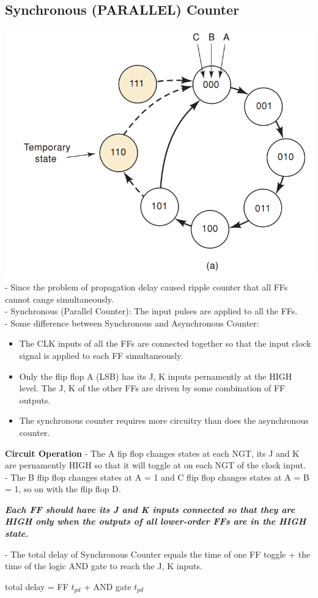 \documentclass[12pt]{article}
\begin{document}
\subsection{Synchronous (PARALLEL) Counter}
\includegraphics[scale = 0.6]{hinh41}
\bigbreak
- Since the problem of propagation delay caused ripple counter that all FFs cannot cange simultaneously. \\
- Synchronous (Parallel Counter): The input pulses are applied to all the FFs. \\
- Some difference between Synchronous and Asynchronous Counter: \\
\begin{itemize}
	\item The CLK inputs of all the FFs are connected together so that the input clock signal is applied to each FF simultaneously.
	\item Only the flip flop A (LSB) has its J, K inputs pernamently at the HIGH level.
	The J, K of the other FFs are driven by some combination of FF outputs.
	\item The synchronous counter requires more circuitry than does the asynchronous counter.
\end{itemize}
\textbf{Circuit Operation}
- The A fip flop changes states at each NGT, its J and K are pernamently HIGH so that it will toggle at on each NGT of the clock input. \\
- The B flip flop changes states at A = 1 and C flip flop changes states at A = B = 1, so on with the flip flop D. \\
\begin{center}
\textit{\textbf{Each FF should have its J and K inputs connected so that they are HIGH only when the outputs of all lower-order FFs are in the HIGH state.}}
\end{center}
- The total delay of Synchronous Counter equals the time of one FF toggle + the time of the logic AND gate to reach the J, K inputs.
\begin{mybox}
	\begin{center}
		total delay = FF $t_{pd}$ + AND gate $t_{pd}$
	\end{center}
\end{mybox}
\end{document}
